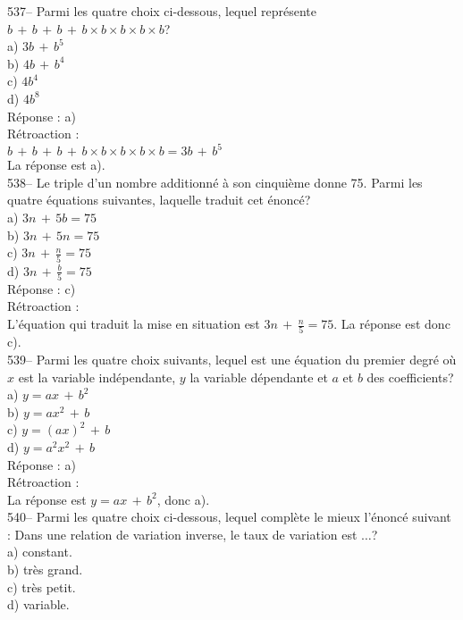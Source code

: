 ﻿\documentclass[letterpaper, 12pt]{article}
\begin{document}
537-- Parmi les quatre choix ci-dessous, lequel repr\'esente
$b\,+\,b\,+\,b\,+\,b\times b\times b \times b \times b$?\\
a) $3b\,+\,b^{5}$\\
b) $4b\,+\,b^{4}$\\
c) $4b^{4}$\\
d) $4b^{8}$\\


R\'eponse : a)\\

R\'etroaction : \\
$b\,+\,b\,+\,b\,+\,b\times b\times b \times b \times b= 3b\,+\,b^{5}$\\
La r\'eponse est a).\\

538-- Le triple d'un nombre additionn\'e \`a son cinqui\`eme donne 75.
Parmi les quatre \'equations suivantes, laquelle traduit cet \'enonc\'e?\\
a) $3n\,+\,5b=75$\\[2mm]
b) $3n\,+\,5n=75$\\[2mm]
c) $3n\,+\,\frac{n}{5}=75$\\[2mm]
d) $3n\,+\,\frac{b}{5}=75$\\

R\'eponse : c)\\

R\'etroaction : \\
L'\'equation qui traduit la mise en situation est $3n\,+\,\frac{n}{5}=75$.
La r\'eponse est donc c).\\


539-- Parmi les quatre choix suivants, lequel est une \'equation du premier
degr\'e o\`u $x$ est la variable ind\'ependante, $y$ la variable
d\'ependante et $a$ et $b$ des coefficients?\\
a) $y=ax\,+\,b^{2}$ \\
b) $y=ax^{2}\,+\,b$\\
c) $y=\left( ax\right) ^{2}\,+\,b$\\
d) $y=a^{2}x^{2}\,+\,b$\\

R\'eponse : a)\\

R\'etroaction : \\
La r\'eponse est $y=ax\,+\,b^{2}$, donc a). \\

540-- Parmi les quatre choix ci-dessous, lequel compl\`ete le mieux
l'\'enonc\'e suivant : \og Dans une relation de variation inverse,
le taux de variation est $\ldots$\fg ?\\
a) constant.\\
b) tr\`es grand.\\
c) tr\`es petit.\\
d) variable.\\
\end{document}
